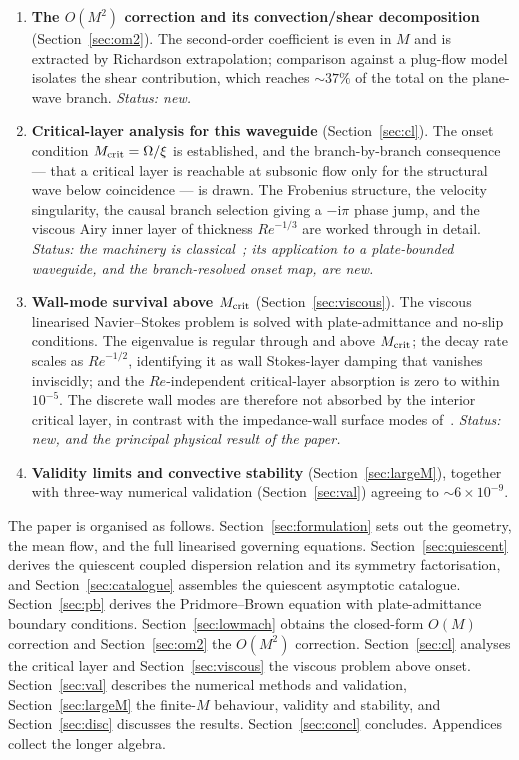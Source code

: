 \documentclass[11pt,a4paper]{article}
\newcommand{\Om}{\Omega}
\newcommand{\ii}{\mathrm{i}}
\newcommand{\Rey}{\mathit{Re}}
\theoremstyle{plain}
\theoremstyle{remark}
\begin{document}
\begin{enumerate}[label=(\roman*),leftmargin=2.2em]
\item \textbf{The $O(M^2)$ correction and its convection/shear decomposition}
(Section~\ref{sec:om2}). The second-order coefficient is even in $M$ and is extracted by Richardson
extrapolation; comparison against a plug-flow model isolates the shear contribution, which reaches
$\sim37\%$ of the total on the plane-wave branch. \emph{Status: new.}

\item \textbf{Critical-layer analysis for this waveguide} (Section~\ref{sec:cl}). The onset condition
$M_{\rm crit}=\Om/\xi$ is established, and the branch-by-branch consequence --- that a critical layer is
reachable at subsonic flow only for the structural wave below coincidence --- is drawn. The Frobenius
structure, the velocity singularity, the causal branch selection giving a $-\ii\pi$ phase jump, and the
viscous Airy inner layer of thickness $\Rey^{-1/3}$ are worked through in detail.
\emph{Status: the machinery is classical~\cite{maslowe,brambleydarau,king2022}; its application to a
plate-bounded waveguide, and the branch-resolved onset map, are new.}

\item \textbf{Wall-mode survival above $M_{\rm crit}$} (Section~\ref{sec:viscous}). The viscous
linearised Navier--Stokes problem is solved with plate-admittance and no-slip conditions. The eigenvalue
is regular through and above $M_{\rm crit}$; the decay rate scales as $\Rey^{-1/2}$, identifying it as
wall Stokes-layer damping that vanishes inviscidly; and the $\Rey$-independent critical-layer
absorption is zero to within $10^{-5}$. The discrete wall modes are therefore not absorbed by the
interior critical layer, in contrast with the impedance-wall surface modes of~\cite{brambleydarau}.
\emph{Status: new, and the principal physical result of the paper.}

\item \textbf{Validity limits and convective stability} (Section~\ref{sec:largeM}), together with
three-way numerical validation (Section~\ref{sec:val}) agreeing to $\sim6\times10^{-9}$.
\end{enumerate}

\noindent The paper is organised as follows. Section~\ref{sec:formulation} sets out the geometry, the
mean flow, and the full linearised governing equations. Section~\ref{sec:quiescent} derives the
quiescent coupled dispersion relation and its symmetry factorisation, and Section~\ref{sec:catalogue}
assembles the quiescent asymptotic catalogue. Section~\ref{sec:pb} derives the Pridmore--Brown equation
with plate-admittance boundary conditions. Section~\ref{sec:lowmach} obtains the closed-form $O(M)$
correction and Section~\ref{sec:om2} the $O(M^2)$ correction. Section~\ref{sec:cl} analyses the critical
layer and Section~\ref{sec:viscous} the viscous problem above onset. Section~\ref{sec:val} describes
the numerical methods and validation, Section~\ref{sec:largeM} the finite-$M$ behaviour, validity and
stability, and Section~\ref{sec:disc} discusses the results. Section~\ref{sec:concl} concludes.
Appendices collect the longer algebra.
\end{document}
